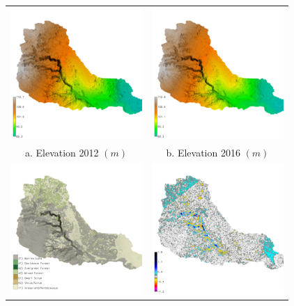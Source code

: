 \documentclass{standalone}
\begin{document}
\scriptsize
\centering 

\begin{tabular}{m{} m{}}
%
\multicolumn{1}{c}{\includegraphics[height=50mm]{../../images/sample_data/elevation_2012.png}} &
\multicolumn{1}{c}{\includegraphics[height=50mm]{../../images/sample_data/elevation_2016.png}}\\
\multicolumn{1}{c}{a. Elevation 2012 $(m)$} & \multicolumn{1}{c}{b. Elevation 2016 $(m)$}\\
%
\multicolumn{1}{c}{\includegraphics[height=50mm]{../../images/sample_data/landcover.png}} &
\multicolumn{1}{c}{\includegraphics[height=50mm]{../../images/sample_data/difference_2012_2016.png}}\\

\end{tabular}
\end{document}
